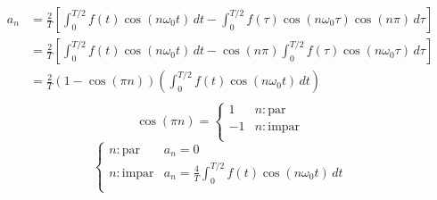 \begin{equation*}
\begin{split}
    a_n
        &=\frac{2}{T}\left[
            \int_0^{T/2} f(t)\cos(n\omega_0 t)\,dt-
            \int_0^{T/2} f(\tau)\cos(n\omega_0\tau)\cos(n\pi)\,d\tau
        \right]\\
        &=\frac{2}{T}\left[
            \int_0^{T/2} f(t)\cos(n\omega_0 t)\,dt-\cos(n\pi)\int_0^{T/2}
                f(\tau)\cos(n\omega_0\tau)\,d\tau
        \right]\\
        &=\frac{2}{T}(1-\cos(\pi n))\left(
            \int_0^{T/2} f(t)\cos(n\omega_0 t)\,dt
        \right)\\
\end{split}
\end{equation*}
\begin{equation*}
    \cos(\pi n)=\begin{cases}
        1 &n: \text{par}\\
        -1 &n: \text{impar}\\
    \end{cases}
\end{equation*}
\begin{equation}
\begin{cases}
    n: \text{par}   &a_n=0\\
    n: \text{impar} &a_n=\frac{4}{T}\int_0^{T/2}f(t)\cos(n\omega_0 t)\,dt\\
\end{cases}
\end{equation}

